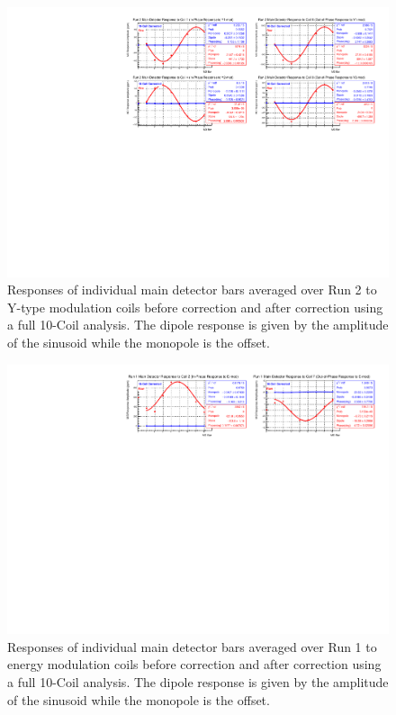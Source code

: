 \begin{landscape}
\begin{figure}[!ht]
\begin{center}
\includegraphics[width=9in]{./Pictures/Run2_Y_dipole10-Coil.pdf}
\caption{\label{fig:Run2_10coil_Ydipoles_app}Responses of individual main detector bars averaged over Run 2 to Y-type modulation coils before correction and after correction using a full 10-Coil analysis. The dipole response is given by the amplitude of the sinusoid while the monopole is the offset.}
\end{center}
\end{figure}

\begin{figure}[!ht]
\begin{center}
\includegraphics[width=9in]{./Pictures/Run1_E_dipole10-Coil.pdf}
\caption{\label{fig:Run1_10coil_Edipoles_app}Responses of individual main detector bars averaged over Run 1 to energy modulation coils before correction and after correction using a full 10-Coil analysis. The dipole response is given by the amplitude of the sinusoid while the monopole is the offset.}
\end{center}
\end{figure}


\end{landscape}
